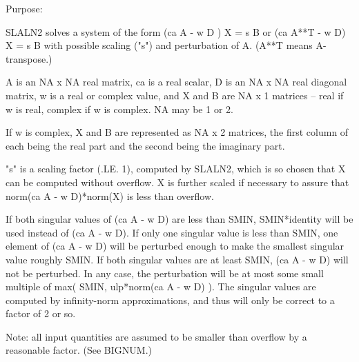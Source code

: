  \begin{DoxyParagraph}{Purpose\+: }
\begin{DoxyVerb} SLALN2 solves a system of the form  (ca A - w D ) X = s B
 or (ca A**T - w D) X = s B   with possible scaling ("s") and
 perturbation of A.  (A**T means A-transpose.)

 A is an NA x NA real matrix, ca is a real scalar, D is an NA x NA
 real diagonal matrix, w is a real or complex value, and X and B are
 NA x 1 matrices -- real if w is real, complex if w is complex.  NA
 may be 1 or 2.

 If w is complex, X and B are represented as NA x 2 matrices,
 the first column of each being the real part and the second
 being the imaginary part.

 "s" is a scaling factor (.LE. 1), computed by SLALN2, which is
 so chosen that X can be computed without overflow.  X is further
 scaled if necessary to assure that norm(ca A - w D)*norm(X) is less
 than overflow.

 If both singular values of (ca A - w D) are less than SMIN,
 SMIN*identity will be used instead of (ca A - w D).  If only one
 singular value is less than SMIN, one element of (ca A - w D) will be
 perturbed enough to make the smallest singular value roughly SMIN.
 If both singular values are at least SMIN, (ca A - w D) will not be
 perturbed.  In any case, the perturbation will be at most some small
 multiple of max( SMIN, ulp*norm(ca A - w D) ).  The singular values
 are computed by infinity-norm approximations, and thus will only be
 correct to a factor of 2 or so.

 Note: all input quantities are assumed to be smaller than overflow
 by a reasonable factor.  (See BIGNUM.)\end{DoxyVerb}
 
\end{DoxyParagraph}

